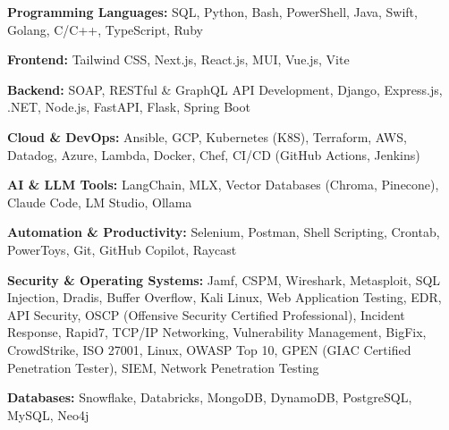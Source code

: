 \textbf{Programming Languages:} SQL, Python, Bash, PowerShell, Java, Swift, Golang, C/C++, TypeScript, Ruby
\vspace{3pt}

\textbf{Frontend:} Tailwind CSS, Next.js, React.js, MUI, Vue.js, Vite
\vspace{3pt}

\textbf{Backend:} SOAP, RESTful \& GraphQL API Development, Django, Express.js, .NET, Node.js, FastAPI, Flask, Spring Boot
\vspace{3pt}

\textbf{Cloud \& DevOps:} Ansible, GCP, Kubernetes (K8S), Terraform, AWS, Datadog, Azure, Lambda, Docker, Chef, CI/CD (GitHub Actions, Jenkins)
\vspace{3pt}

\textbf{AI \& LLM Tools:} LangChain, MLX, Vector Databases (Chroma, Pinecone), Claude Code, LM Studio, Ollama
\vspace{3pt}

\textbf{Automation \& Productivity:} Selenium, Postman, Shell Scripting, Crontab, PowerToys, Git, GitHub Copilot, Raycast
\vspace{3pt}

\textbf{Security \& Operating Systems:} Jamf, CSPM, Wireshark, Metasploit, SQL Injection, Dradis, Buffer Overflow, Kali Linux, Web Application Testing, EDR, API Security, OSCP (Offensive Security Certified Professional), Incident Response, Rapid7, TCP/IP Networking, Vulnerability Management, BigFix, CrowdStrike, ISO 27001, Linux, OWASP Top 10, GPEN (GIAC Certified Penetration Tester), SIEM, Network Penetration Testing
\vspace{3pt}

\textbf{Databases:} Snowflake, Databricks, MongoDB, DynamoDB, PostgreSQL, MySQL, Neo4j